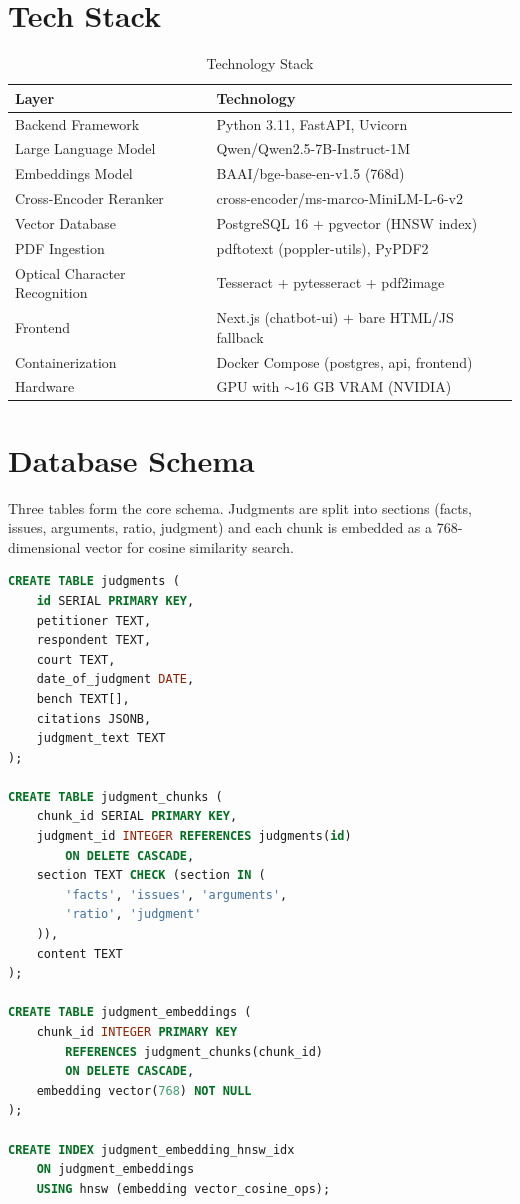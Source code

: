 \documentclass[11pt,a4paper]{article}
\begin{document}
\section{Tech Stack}

\begin{table}[H]
\centering
\begin{tabular}{ll}
\toprule
\textbf{Layer} & \textbf{Technology} \\
\midrule
Backend Framework & Python 3.11, FastAPI, Uvicorn \\
Large Language Model & Qwen/Qwen2.5-7B-Instruct-1M \\
Embeddings Model & BAAI/bge-base-en-v1.5 (768d) \\
Cross-Encoder Reranker & cross-encoder/ms-marco-MiniLM-L-6-v2 \\
Vector Database & PostgreSQL 16 + pgvector (HNSW index) \\
PDF Ingestion & pdftotext (poppler-utils), PyPDF2 \\
Optical Character Recognition & Tesseract + pytesseract + pdf2image \\
Frontend & Next.js (chatbot-ui) + bare HTML/JS fallback \\
Containerization & Docker Compose (postgres, api, frontend) \\
Hardware & GPU with $\sim$16 GB VRAM (NVIDIA) \\
\bottomrule
\end{tabular}
\caption{Technology Stack}
\end{table}

\section{Database Schema}

Three tables form the core schema. Judgments are split into sections
(facts, issues, arguments, ratio, judgment) and each chunk is embedded
as a 768-dimensional vector for cosine similarity search.

\begin{lstlisting}[language=SQL]
CREATE TABLE judgments (
    id SERIAL PRIMARY KEY,
    petitioner TEXT,
    respondent TEXT,
    court TEXT,
    date_of_judgment DATE,
    bench TEXT[],
    citations JSONB,
    judgment_text TEXT
);

CREATE TABLE judgment_chunks (
    chunk_id SERIAL PRIMARY KEY,
    judgment_id INTEGER REFERENCES judgments(id)
        ON DELETE CASCADE,
    section TEXT CHECK (section IN (
        'facts', 'issues', 'arguments',
        'ratio', 'judgment'
    )),
    content TEXT
);

CREATE TABLE judgment_embeddings (
    chunk_id INTEGER PRIMARY KEY
        REFERENCES judgment_chunks(chunk_id)
        ON DELETE CASCADE,
    embedding vector(768) NOT NULL
);

CREATE INDEX judgment_embedding_hnsw_idx
    ON judgment_embeddings
    USING hnsw (embedding vector_cosine_ops);
\end{lstlisting}
\end{document}

